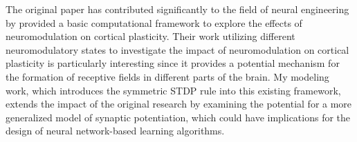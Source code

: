 The original paper has contributed significantly to the field of neural engineering by provided a basic computational framework to explore the effects of neuromodulation on cortical plasticity. Their work utilizing different neuromodulatory states to investigate the impact of neuromodulation on cortical plasticity is particularly interesting since it provides a potential mechanism for the formation of receptive fields in different parts of the brain. My modeling work, which introduces the symmetric STDP rule into this existing framework, extends the impact of the original research by examining the potential for a more generalized model of synaptic potentiation, which could have implications for the design of neural network-based learning algorithms.
